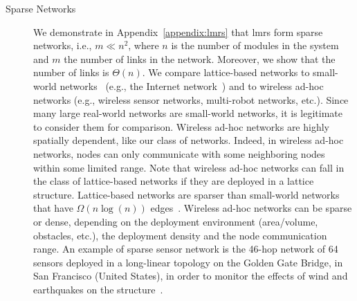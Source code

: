 \begin{description}
	\item[Sparse Networks]  We demonstrate in Appendix~\ref{appendix:lmrs} that \gls{lmrs} form sparse networks, i.e., $m \ll n^2$, where $n$ is the number of modules in the system and $m$ the number of links in the network. Moreover, we show that the number of links is $\Theta(n)$. We compare lattice-based networks to small-world networks~\cite{watts1998collective} (e.g., the Internet network~\cite{jin2006small}) and to wireless ad-hoc networks (e.g., wireless sensor networks, multi-robot networks, etc.). Since many large real-world networks are small-world networks, it is legitimate to consider them for comparison. Wireless ad-hoc networks are highly spatially dependent, like our class of networks. Indeed, in wireless ad-hoc networks, nodes can only communicate with some neighboring nodes within some limited range. Note that wireless ad-hoc networks can fall in the class of lattice-based networks if they are deployed in a lattice structure. Lattice-based networks are sparser than small-world networks that have $\Omega(n\log(n))$ edges~\cite{watts1998collective}. Wireless ad-hoc networks can be sparse or dense, depending on the deployment environment (area/volume, obstacles, etc.), the deployment density and the node communication range. An example of sparse sensor network is the 46-hop network of 64 sensors deployed in a long-linear topology on the Golden Gate Bridge, in San Francisco (United States), in order to monitor the effects of wind and earthquakes on the structure~\cite{kim2007health}.


\end{description}
